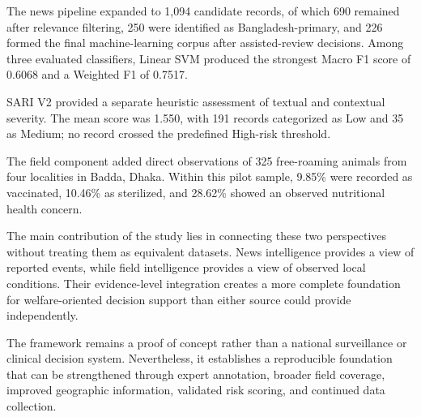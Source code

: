 \documentclass[conference]{IEEEtran}
\begin{document}
The news pipeline expanded to 1,094 candidate records, of which 690 remained
after relevance filtering, 250 were identified as Bangladesh-primary, and
226 formed the final machine-learning corpus after assisted-review decisions.
Among three evaluated classifiers, Linear SVM produced the strongest Macro
F1 score of 0.6068 and a Weighted F1 of 0.7517.

SARI V2 provided a separate heuristic assessment of textual and contextual
severity. The mean score was 1.550, with 191 records categorized as Low and
35 as Medium; no record crossed the predefined High-risk threshold.

The field component added direct observations of 325 free-roaming animals
from four localities in Badda, Dhaka. Within this pilot sample, 9.85\% were
recorded as vaccinated, 10.46\% as sterilized, and 28.62\% showed an observed
nutritional health concern.

The main contribution of the study lies in connecting these two perspectives
without treating them as equivalent datasets. News intelligence provides a
view of reported events, while field intelligence provides a view of observed
local conditions. Their evidence-level integration creates a more complete
foundation for welfare-oriented decision support than either source could
provide independently.

The framework remains a proof of concept rather than a national surveillance
or clinical decision system. Nevertheless, it establishes a reproducible
foundation that can be strengthened through expert annotation, broader field
coverage, improved geographic information, validated risk scoring, and
continued data collection.




\end{document}
